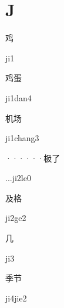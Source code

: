 ﻿%
\section*{J}

\begin{verbete}[ji1]{鸡}
\begin{pronuncia}{ji1}
\end{pronuncia}
\end{verbete}

\begin{verbete}[ji1dan4]{鸡蛋}
\begin{pronuncia}{ji1dan4}
\end{pronuncia}
\end{verbete}

\begin{verbete}[ji1chang3]{机场}
\begin{pronuncia}{ji1chang3}
\end{pronuncia}
\end{verbete}

\begin{verbete}[...ji2le0]{······极了}
\begin{pronuncia}{...ji2le0}
\end{pronuncia}
\end{verbete}

\begin{verbete}[ji2ge2]{及格}
\begin{pronuncia}{ji2ge2}
\end{pronuncia}
\end{verbete}

\begin{verbete}[ji3]{几}
\begin{pronuncia}{ji3}
\end{pronuncia}
\end{verbete}

\begin{verbete}[ji4jie2]{季节}
\begin{pronuncia}{ji4jie2}
\end{pronuncia}
\end{verbete}

